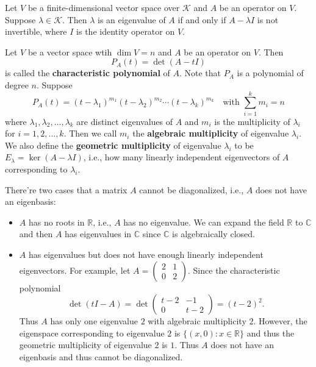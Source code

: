 \documentclass{ctexart}
\newcommand{\R}{\mathbb{R}}
\newcommand{\C}{\mathbb{C}}
\begin{document}
    \begin{mythm}
        Let $V$ be a finite-dimensional vector space over $\mathcal{K}$ and $A$ be an operator on $V$. Suppose $\lambda \in \mathcal{K}$. Then $\lambda$ is an eigenvalue of $A$ if and only if $A-\lambda I$ is not invertible, where $I$ is the identity operator on $V$.
    \end{mythm}
    \begin{mydef}
        Let $V$ be a vector space wtih $\dim V = n$ and $A$ be an operator on $V$. Then
        $$ P_A(t) = \det(A-tI) $$
        is called the \textbf{characteristic polynomial} of $A$. Note that $P_A$ is a polynomial of degree $n$. Suppose $$P_A(t) = (t-\lambda_1)^{m_1} (t-\lambda_2)^{m_2} \cdots (t-\lambda_k)^{m_k}\quad \text{with } \sum_{i=1}^k m_i = n $$ where $\lambda_1, \lambda_2, \ldots, \lambda_k$ are distinct eigenvalues of $A$ and $m_i$ is the multiplicity of $\lambda_i$ for $i=1,2,\ldots,k$. Then we call $m_i$ the \textbf{algebraic multiplicity} of eigenvalue $\lambda_i$. We also define the \textbf{geometric multiplicity} of eigenvalue $\lambda_i$ to be $E_\lambda=\ker(A-\lambda I)$, i.e., how many linearly independent eigenvectors of $A$ corresponding to $\lambda_i$.
    \end{mydef}
    \begin{myrmk}
        There're two cases that a matrix $A$ cannot be diagonalized, i.e., $A$ does not have an eigenbasis:
        \begin{itemize}
            \item $A$ has no roots in $\R$, i.e., $A$ has no eigenvalue. We can expand the field $\R$ to $\C$ and then $A$ has eigenvalues in $\C$ since $\C$ is algebraically closed.
            \item $A$ has eigenvalues but does not have enough linearly independent eigenvectors. For example, let $\displaystyle A=\begin{pmatrix}
            2 & 1\\
            0 & 2
            \end{pmatrix}.$ Since the characteristic polynomial $$\det(tI-A)=\det\begin{pmatrix}
            t-2 & -1\\
            0 & t-2
            \end{pmatrix}
            =(t-2)^2.$$ Thus $A$ has only one eigenvalue $2$ with algebraic multiplicity $2$. However, the eigenspace corresponding to eigenvalue $2$ is $\{(x,0): x\in \R\}$ and thus the geometric multiplicity of eigenvalue $2$ is $1$. Thus $A$ does not have an eigenbasis and thus cannot be diagonalized.
        \end{itemize}
        
    \end{myrmk}
\end{document}
